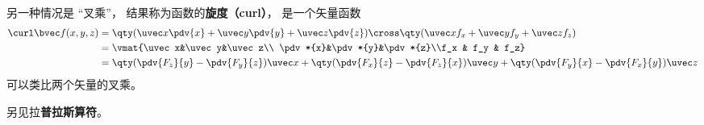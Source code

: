 另一种情况是 “叉乘”， 结果称为函数的\textbf{旋度（curl）}， 是一个矢量函数
\begin{equation}\label{eq_VecOp_3}
\begin{aligned}
\curl \bvec f(x, y, z) &= \qty(\uvec x \pdv{x} + \uvec y \pdv{y} + \uvec z \pdv{z}) \cross \qty(\uvec x f_x + \uvec y f_y + \uvec z f_z)\\
&= \vmat{\uvec x&\uvec y&\uvec z\\ \pdv*{x}&\pdv*{y}&\pdv*{z}\\f_x & f_y & f_z}\\
&= \qty(\pdv{F_z}{y} - \pdv{F_y}{z})\uvec x + \qty(\pdv{F_x}{z} - \pdv{F_z}{x})\uvec y + \qty(\pdv{F_y}{x} - \pdv{F_x}{y})\uvec z
\end{aligned}
\end{equation}
可以类比两个矢量的叉乘。

另见拉\textbf{普拉斯算符}。
